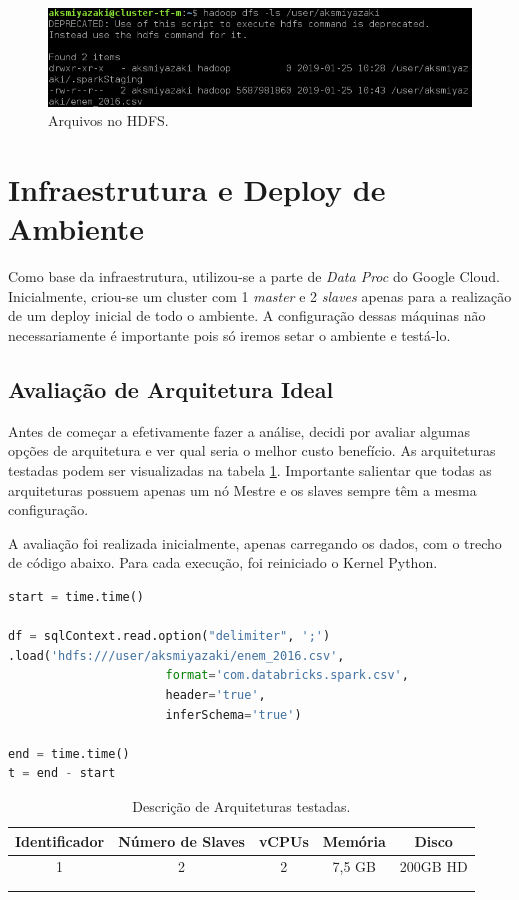 \documentclass{article}
\begin{document}
\begin{figure}[H]
  \includegraphics[width=\linewidth]{img/file_hdfs.png}
  \caption{Arquivos no HDFS.}
  \label{fig:data_on_hdfs}
\end{figure}

\newpage
\section{Infraestrutura e Deploy de Ambiente}

Como base da infraestrutura, utilizou-se a parte de \emph{Data Proc} do Google Cloud. Inicialmente, criou-se um cluster com 1 \emph{master} e 2 \emph{slaves} apenas para a realização de um deploy inicial de todo o ambiente. A configuração dessas máquinas não necessariamente é importante pois só iremos setar o ambiente e testá-lo.

\subsection{Avaliação de Arquitetura Ideal}

Antes de começar a efetivamente fazer a análise, decidi por avaliar algumas opções de arquitetura e ver qual seria o melhor custo benefício. As arquiteturas testadas podem ser visualizadas na tabela \ref{tab:arqs}. Importante salientar que todas as arquiteturas possuem apenas um nó Mestre e os slaves sempre têm a mesma configuração.

A avaliação foi realizada inicialmente, apenas carregando os dados, com o trecho de código abaixo. Para cada execução, foi reiniciado o Kernel Python.

\begin{lstlisting}[language=python]
start = time.time()

df = sqlContext.read.option("delimiter", ';')
.load('hdfs:///user/aksmiyazaki/enem_2016.csv', 
                      format='com.databricks.spark.csv', 
                      header='true', 
                      inferSchema='true')

end = time.time()
t = end - start
\end{lstlisting}

\begin{table}[H]
\centering
\begin{tabular}{|c|c|c|c|c|}
\hline
Identificador & Número de Slaves & vCPUs &  Memória & Disco \\ \hline
1 &2 & 2 & 7,5 GB & 200GB HD \\ \hline
 & &  & & \\ \hline
 & &  & & \\ \hline
\end{tabular}
\caption{Descrição de Arquiteturas testadas.}
\label{tab:arqs}
\end{table}
\end{document}
